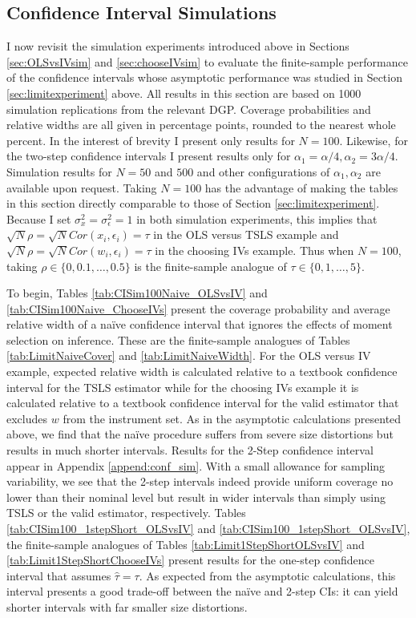 \subsection{Confidence Interval Simulations}
\label{sec:CIsim}
I now revisit the simulation experiments introduced above in Sections \ref{sec:OLSvsIVsim} and \ref{sec:chooseIVsim} to evaluate the finite-sample performance of the confidence intervals whose asymptotic performance was studied in Section \ref{sec:limitexperiment} above.
All results in this section are based on 1000 simulation replications from the relevant DGP.
Coverage probabilities and relative widths are all given in percentage points, rounded to the nearest whole percent.
In the interest of brevity I present only results for $N=100$.
Likewise, for the two-step confidence intervals I present results only for $\alpha_1 = \alpha/4, \alpha_2 = 3\alpha/4$.
Simulation results for $N=50$ and $500$ and other configurations of $\alpha_1,\alpha_2$ are available upon request.
Taking $N=100$ has the advantage of making the tables in this section directly comparable to those of Section \ref{sec:limitexperiment}.
Because I set $\sigma_x^2 = \sigma_\epsilon^2 = 1$ in both simulation experiments, this implies that $\sqrt{N}\rho = \sqrt{N} Cor(x_i,\epsilon_i) = \tau$ in the OLS versus TSLS example and $\sqrt{N}\rho = \sqrt{N} Cor(w_i, \epsilon_i) = \tau$ in the choosing IVs example. 
Thus when $N = 100$, taking $\rho \in \{0, 0.1, \dots, 0.5\}$ is the finite-sample analogue of $\tau \in \{0, 1, \dots, 5\}$.

To begin, Tables \ref{tab:CISim100Naive_OLSvsIV} and \ref{tab:CISim100Naive_ChooseIVs} present the coverage probability and average relative width of a na\"{i}ve confidence interval that ignores the effects of moment selection on inference.
These are the finite-sample analogues of Tables \ref{tab:LimitNaiveCover} and \ref{tab:LimitNaiveWidth}.
For the OLS versus IV example, expected relative width is calculated relative to a textbook confidence interval for the TSLS estimator while for the choosing IVs example it is calculated relative to a textbook confidence interval for the valid estimator that excludes $w$ from the instrument set. 
As in the asymptotic calculations presented above, we find that the na\"{i}ve procedure suffers from severe size distortions but results in much shorter intervals.
Results for the 2-Step confidence interval appear in Appendix \ref{append:conf_sim}.
With a small allowance for sampling variability, we see that the 2-step intervals indeed provide uniform coverage no lower than their nominal level but result in wider intervals than simply using TSLS or the valid estimator, respectively.
Tables \ref{tab:CISim100_1stepShort_OLSvsIV} and \ref{tab:CISim100_1stepShort_OLSvsIV}, the finite-sample analogues of Tables \ref{tab:Limit1StepShortOLSvsIV} and \ref{tab:Limit1StepShortChooseIVs} present results for the one-step confidence interval that assumes $\widehat{\tau} = \tau$.
As expected from the asymptotic calculations, this interval presents a good trade-off between the na\"{i}ve and 2-step CIs: it can yield shorter intervals with far smaller size distortions.




